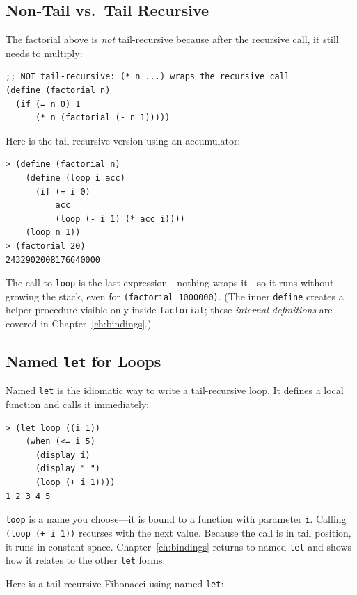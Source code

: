 \subsection{Non-Tail vs.\ Tail Recursive}

The factorial above is \emph{not} tail-recursive because after the recursive call, it still needs to multiply:

\begin{lstlisting}
;; NOT tail-recursive: (* n ...) wraps the recursive call
(define (factorial n)
  (if (= n 0) 1
      (* n (factorial (- n 1)))))
\end{lstlisting}

Here is the tail-recursive version using an accumulator:

\begin{lstlisting}[style=repl]
> (define (factorial n)
    (define (loop i acc)
      (if (= i 0)
          acc
          (loop (- i 1) (* acc i))))
    (loop n 1))
> (factorial 20)
2432902008176640000
\end{lstlisting}

The call to \texttt{loop} is the last expression---nothing wraps it---so it runs without growing the stack, even for \texttt{(factorial 1000000)}. (The inner \texttt{define} creates a helper procedure visible only inside \texttt{factorial}; these \emph{internal definitions} are covered in Chapter~\ref{ch:bindings}.)

\subsection{Named \texttt{let} for Loops}

Named \texttt{let} is the idiomatic way to write a tail-recursive loop. It defines a local function and calls it immediately:

\begin{lstlisting}[style=repl]
> (let loop ((i 1))
    (when (<= i 5)
      (display i)
      (display " ")
      (loop (+ i 1))))
1 2 3 4 5
\end{lstlisting}

\texttt{loop} is a name you choose---it is bound to a function with parameter \texttt{i}. Calling \texttt{(loop (+ i 1))} recurses with the next value. Because the call is in tail position, it runs in constant space. Chapter~\ref{ch:bindings} returns to named \texttt{let} and shows how it relates to the other \texttt{let} forms.

Here is a tail-recursive Fibonacci using named \texttt{let}:


